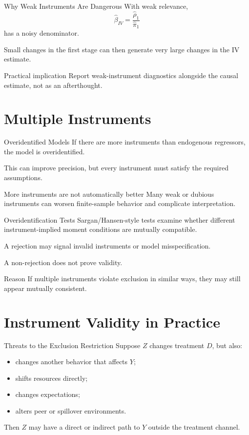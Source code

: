 \documentclass[aspectratio=169,11pt]{beamer}
\begin{document}
\begin{frame}{Why Weak Instruments Are Dangerous}
With weak relevance,
\[
\widehat{\beta}_{IV}
=
\frac{\widehat{\rho}_1}{\widehat{\pi}_1}
\]
has a noisy denominator.

Small changes in the first stage can then generate very large changes in the IV estimate.

\begin{block}{Practical implication}
Report weak-instrument diagnostics alongside the causal estimate, not as an afterthought.
\end{block}
\end{frame}

\section{Multiple Instruments}

\begin{frame}{Overidentified Models}
If there are more instruments than endogenous regressors, the model is overidentified.

This can improve precision, but every instrument must satisfy the required assumptions.

\begin{alertblock}{More instruments are not automatically better}
Many weak or dubious instruments can worsen finite-sample behavior and complicate interpretation.
\end{alertblock}
\end{frame}

\begin{frame}{Overidentification Tests}
Sargan/Hansen-style tests examine whether different instrument-implied moment conditions are mutually compatible.

A rejection may signal invalid instruments or model misspecification.

A non-rejection does not prove validity.

\begin{block}{Reason}
If multiple instruments violate exclusion in similar ways, they may still appear mutually consistent.
\end{block}
\end{frame}

\section{Instrument Validity in Practice}

\begin{frame}{Threats to the Exclusion Restriction}
Suppose \(Z\) changes treatment \(D\), but also:
\begin{itemize}
\item changes another behavior that affects \(Y\);
\item shifts resources directly;
\item changes expectations;
\item alters peer or spillover environments.
\end{itemize}

Then \(Z\) may have a direct or indirect path to \(Y\) outside the treatment channel.
\end{frame}
\end{document}
